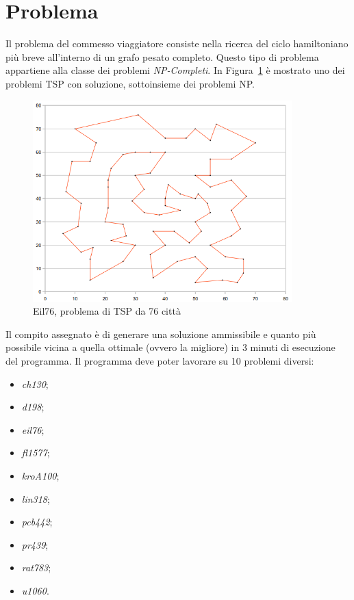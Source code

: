 \chapter*{Problema}
\label{cha_problema}

Il problema del commesso viaggiatore consiste nella ricerca del ciclo hamiltoniano più breve all'interno di un grafo pesato completo. Questo tipo di problema appartiene alla classe dei problemi \emph{NP-Completi}. In Figura~\ref{fig_eil76} è mostrato uno dei problemi TSP con soluzione, sottoinsieme dei problemi NP.

\begin{figure}[H]
  \centering
  \includegraphics[width=10.0cm]{immagini/eil76.png}
  \caption{Eil76, problema di TSP da 76 città\label{fig_eil76}}
\end{figure}

Il compito assegnato è di generare una soluzione ammissibile e quanto più possibile vicina a quella ottimale (ovvero la migliore) in 3 minuti di esecuzione del programma. Il programma deve poter lavorare su 10 problemi diversi:
\begin{itemize}
  \item \emph{ch130};
  \item \emph{d198};
  \item \emph{eil76};
  \item \emph{fl1577};
  \item \emph{kroA100};
  \item \emph{lin318};
  \item \emph{pcb442};
  \item \emph{pr439};
  \item \emph{rat783};
  \item \emph{u1060}.
\end{itemize}

